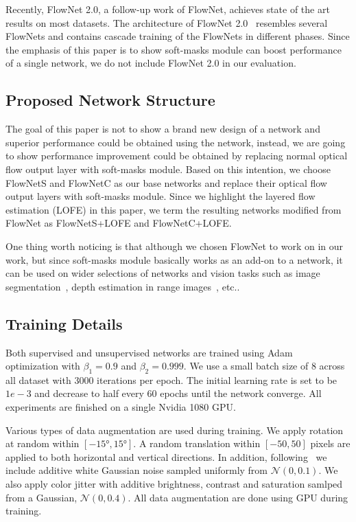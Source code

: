 \documentclass[10pt,twocolumn,letterpaper]{article}
\begin{document}
Recently, FlowNet 2.0, a follow-up work of FlowNet, achieves state of the art results on most datasets. The architecture of FlowNet 2.0~\cite{Ilg_2017_CVPR} resembles several FlowNets and contains cascade training of the FlowNets in different phases. Since the emphasis of this paper is to show soft-masks module can boost performance of a single network, we do not include FlowNet 2.0 in our evaluation. 

\subsection{Proposed Network Structure}
The goal of this paper is not to show a brand new design of a network and superior performance could be obtained using the network, instead, we are going to show performance improvement could be obtained by replacing normal optical flow output layer with soft-masks module. Based on this intention, we choose FlowNetS and FlowNetC as our base networks and replace their optical flow output layers with soft-masks module. Since we highlight the layered flow estimation (LOFE) in this paper, we term the resulting networks modified from FlowNet as FlowNetS+LOFE and FlowNetC+LOFE. 

One thing worth noticing is that although we chosen FlowNet to work on in our work, but since soft-masks module basically works as an add-on to a network, it can be used on wider selections of networks and vision tasks such as image segmentation~\cite{long2015fully}\cite{noh2015learning}, depth estimation in range images~\cite{eigen2014depth}\cite{eigen2015predicting}, etc..

\subsection{Training Details}
Both supervised and unsupervised networks are trained using Adam~\cite{kingma2014adam} optimization with $\beta_1=0.9$ and $\beta_2=0.999$. We use a small batch size of 8 across all dataset with 3000 iterations per epoch. The initial learning rate is set to be $1e-3$ and decrease to half every 60 epochs until the network converge. All experiments are finished on a single Nvidia 1080 GPU.

Various types of data augmentation are used during training. We apply rotation at random within $[\ang{-15}, \ang{15}]$. A random translation within $[-50, 50]$ pixels are applied to both horizontal and vertical directions. In addition, following~\cite{Ranjan_2017_CVPR} we include additive white Gaussian noise sampled uniformly from $\mathcal{N}(0, 0.1)$. We also apply color jitter with additive brightness, contrast and saturation samlped from a Gaussian, $\mathcal{N}(0, 0.4)$. All data augmentation are done using GPU during training.
\end{document}
